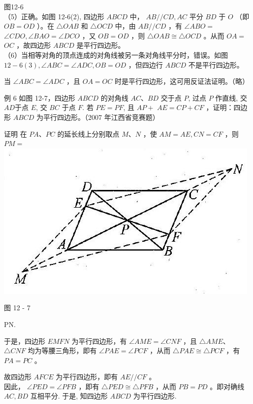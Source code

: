 \documentclass[10pt]{article}
\begin{document}
图12-6\\
（5）正确。如图 12-6(2), 四边形 $A B C D$ 中， $A B / / C D, A C$ 平分 $B D$ 于 $O$ （即 $O B=O D$ ）。在 $\triangle O A B$ 和 $\triangle O C D$ 中，由 $A B / / C D$ ，有 $\angle A B O=$ $\angle C D O, \angle B A O=\angle D C O$ ，又 $O B=O D$ ，则 $\triangle O A B \cong \triangle O C D$ 。从而 $O A=$ $O C$ ，故四边形 $A B C D$ 是平行四边形。\\
（6）当相等对角的顶点连成的对角线被另一条对角线平分时，错误。如图 $12-6(3), \angle A B C=\angle A D C, O B=O D$ ，但四边行 $A B C D$ 不是平行四边形。

当 $\angle A B C=\angle A D C$ ，且 $O A=O C$ 时是平行四边形，这可用反证法证明。（略）

例 6 如图 12-7，四边形 $A B C D$ 的对角线 $A C 、 B D$ 交于点 $P$, 过点 $P$ 作直线, 交 $A D$于点 $E$, 交 $B C$ 于点 $F$. 若 $P E=P F$, 且 $A P+$ $A E=C P+C F$ ，证明：四边形 $A B C D$ 为平行四边形。（2007 年江西省竞赛题）

证明 在 $P A 、 P C$ 的延长线上分别取点 $M 、 N$ ，使 $A M=A E, C N=C F$ ，则 $P M=$\\
\includegraphics[max width=\textwidth, center]{2024_10_30_2c8f45efd4a519b08e1ag-113}

图 12 - 7

PN.

于是，四边形 $E M F N$ 为平行四边形，有 $\angle A M E=\angle C N F$ ，且 $\triangle A M E 、$ $\triangle C N F$ 均为等腰三角形，即有 $\angle P A E=\angle P C F$ ，从而 $\triangle P A E \cong \triangle P C F$ ，有 $P A=P C$ 。

故四边形 $A F C E$ 为平行四边形，即有 $A E / / C F$ 。\\
因此， $\angle P E D=\angle P F B$ ，即有 $\triangle P E D \cong \triangle P F B$ ，从而 $P B=P D$ 。即对确线 $A C, B D$ 互相平分. 于是, 知四边形 $A B C D$ 为平行四边形.
\end{document}
